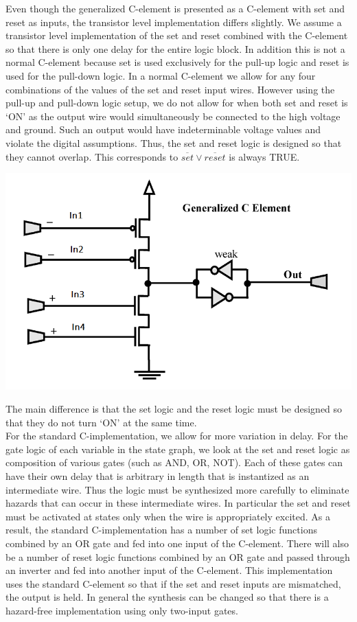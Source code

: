 \documentclass[12pt]{report}
\begin{document}
Even though the generalized C-element is presented as a C-element with set and reset as inputs, the transistor level implementation differs slightly.  We assume a transistor level implementation of the set and reset combined with the C-element so that there is only one delay for the entire logic block.  In addition this is not a normal C-element because set is used exclusively for the pull-up logic and reset is used for the pull-down logic.  In a normal C-element we allow for any four combinations of the values of the set and reset input wires.  However using the pull-up and pull-down logic setup, we do not allow for when both set and reset is `ON' as the output wire would simultaneously be connected to the high voltage and ground.  Such an output would have indeterminable voltage values and violate the digital assumptions.  Thus, the set and reset logic is designed so that they cannot overlap.  This corresponds to $\overline{set}\vee\overline{reset} $ is always TRUE.\\
\begin{center}
\includegraphics[width=.7\textwidth]{genC}
\end{center}

The main difference is that the set logic and the reset logic must be designed so that they do not turn `ON' at the same time.\\

For the standard C-implementation, we allow for more variation in delay.  For the gate logic of each variable in the state graph, we look at the set and reset logic as composition of various gates (such as AND, OR, NOT).  Each of these gates can have their own delay that is arbitrary in length that is instantized as an intermediate wire.  Thus the logic must be synthesized more carefully to eliminate hazards that can occur in these intermediate wires.  In particular the set and reset must be activated at states only when the wire is appropriately excited.  As a result, the standard C-implementation has a number of set logic functions combined by an OR gate and fed into one input of the C-element.  There will also be a number of reset logic functions combined by an OR gate and passed through an inverter and fed into another input of the C-element.  This implementation uses the standard C-element so that if the set and reset inputs are mismatched, the output is held.  In general the synthesis can be changed so that there is a hazard-free implementation using only two-input gates.
 
\end{document}
